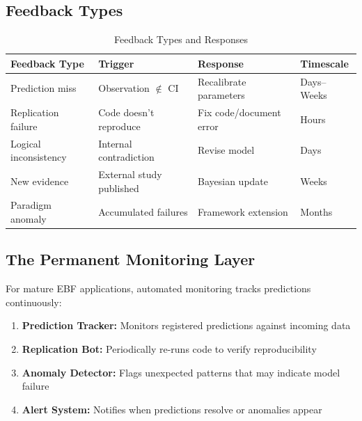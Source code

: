 \subsection{Feedback Types}

\begin{table}[htbp]
\centering
\caption{Feedback Types and Responses}
\label{tab:feedback-types}
\renewcommand{\arraystretch}{1.3}
\small
\begin{tabular}{@{}llll@{}}
\toprule
\textbf{Feedback Type} & \textbf{Trigger} & \textbf{Response} & \textbf{Timescale} \\
\midrule
Prediction miss & Observation $\notin$ CI & Recalibrate parameters & Days--Weeks \\
Replication failure & Code doesn't reproduce & Fix code/document error & Hours \\
Logical inconsistency & Internal contradiction & Revise model & Days \\
New evidence & External study published & Bayesian update & Weeks \\
Paradigm anomaly & Accumulated failures & Framework extension & Months \\
\bottomrule
\end{tabular}
\end{table}

\subsection{The Permanent Monitoring Layer}

For mature EBF applications, automated monitoring tracks predictions continuously:

\begin{enumerate}[nosep]
    \item \textbf{Prediction Tracker:} Monitors registered predictions against incoming data
    \item \textbf{Replication Bot:} Periodically re-runs code to verify reproducibility
    \item \textbf{Anomaly Detector:} Flags unexpected patterns that may indicate model failure
    \item \textbf{Alert System:} Notifies when predictions resolve or anomalies appear
\end{enumerate}




